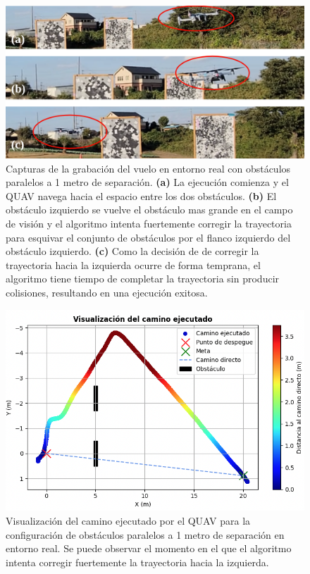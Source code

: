 \begin{figure}[H]
    \centering
    \includegraphics[scale=0.24]{partes/img/real-4-parallelC-1-frames.png}
    \caption[Capturas de la grabación del vuelo en entorno real con obstáculos paralelos a 1 metro de separación.]{Capturas de la grabación del vuelo en entorno real con obstáculos paralelos a 1 metro de separación. \textbf{(a)} La ejecución comienza y el QUAV navega hacia el espacio entre los dos obstáculos. \textbf{(b)} El obstáculo izquierdo se vuelve el obstáculo mas grande en el campo de visión y el algoritmo intenta fuertemente corregir la trayectoria para esquivar el conjunto de obstáculos por el flanco izquierdo del obstáculo izquierdo. \textbf{(c)} Como la decisión de de corregir la trayectoria hacia la izquierda ocurre de forma temprana, el algoritmo tiene tiempo de completar la trayectoria sin producir colisiones, resultando en una ejecución exitosa. }
    \label{real-4-parallelC-1-frames}
\end{figure}

\begin{figure}[H]
    \centering
    \includegraphics[scale=0.5]{partes/img/real-4-parallelC-2-graph.png}
    \caption[Visualización del camino ejecutado por el QUAV para la configuración de obstáculos paralelos a 1 metro de separación en entorno real.]{Visualización del camino ejecutado por el QUAV para la configuración de obstáculos paralelos a 1 metro de separación en entorno real. Se puede observar el momento en el que el algoritmo intenta corregir fuertemente la trayectoria hacia la izquierda.}
    \label{real-4-parallelC-2-graph}
\end{figure}

